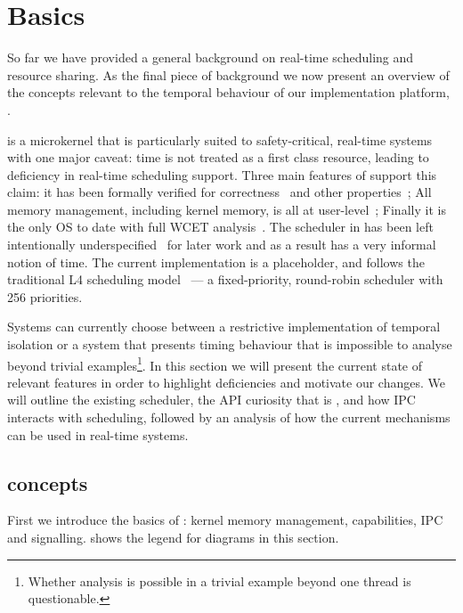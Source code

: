 

\chapter{\selfour Basics}
\label{chap:sel4}

So far we have provided a general background on real-time scheduling and resource sharing.
As the final piece of background we now present an overview of the concepts relevant to the temporal behaviour of our implementation platform, \selfour.

\selfour is a microkernel that is particularly suited to safety-critical, real-time systems with one
major caveat: time is not treated as a first class resource, leading to deficiency in real-time scheduling support. 
Three main features of \selfour support this claim: it has been formally verified for correctness~\citep{Klein_EHACDEEKNSTW_09} and other properties~\citep{Sewell_WGMAK_11}; All memory management, including kernel memory, is all at user-level~\citep{Elkaduwe_Derrin_06}; Finally it is the only \gls{OS} to date with full \gls{WCET} analysis~\citep{Blackham_SCRH_11}.
The scheduler in \selfour has been left intentionally underspecified~\citep{Petters_EH_12} for later work and as a result has a very informal notion of time.
The current implementation is a placeholder, and follows the traditional L4 scheduling model~\citep{Ruocco_06} --- a fixed-priority, round-robin scheduler with 256 priorities.

Systems can currently choose between a restrictive implementation of temporal isolation or a system that presents timing behaviour that is impossible to analyse beyond trivial examples\footnote{Whether analysis is possible in a trivial example beyond one thread is questionable.}.
In this section we will present the current state of relevant \selfour features in order to highlight deficiencies and motivate our changes.
We will outline the existing scheduler, the API curiosity that is \yield, and how \gls{IPC} interacts with scheduling, followed by an analysis of how the current mechanisms can be used in real-time systems.


\section{\selfour concepts}

First we introduce the basics of \selfour: kernel memory management, capabilities, \gls{IPC} and
signalling.  shows the legend for diagrams in this section. 

